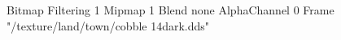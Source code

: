 {Bitmap
	{Filtering 1}
	{Mipmap 1}
	{Blend none}
	{AlphaChannel 0}
	{Frame "/texture/land/town/cobble 14dark.dds"}
}

